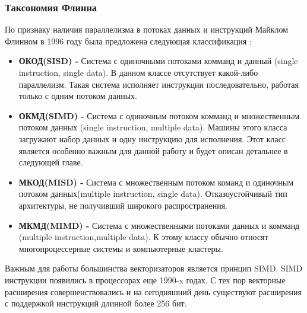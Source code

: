 \subsubsection{Таксономия Флинна}
По признаку наличия параллелизма в потоках данных и инструкций Майклом Флинном в 1996 году была предложена следующая классификация \cite{skillicorn1988taxonomy}:
\begin{itemize}
  \item \textbf{ОКОД(SISD) - } Система с одиночными потоками комманд и данный (single instruction, single data). В данном классе отсутствует какой-либо параллелизм. Такая система исполняет инструкции последовательно, работая только с одним потоком данных.
  
  \item \textbf{ОКМД(SIMD) - } Система с одиночным потоком комманд и множественным потоком данных (single instruction, multiple data). Машины этого класса загружают набор данных и одну инструкцию для исполнения. Этот класс является особенно важным для данной работу и будет описан детальнее в следующей главе.
  
  \item  \textbf{МКОД(MISD) -} Система с множественным потоком команд и одиночным потоком данных(multiple instruction, single data). Отказоустойчивый тип архитектуры, не получивший широкого распространения.
  
  \item  \textbf{МКМД(MIMD) -} Система с множественными потоками данных и комманд (multiple instruction,multiple data). К этому классу обычно относят многопроцессерные системы и компьютерные кластеры. 
\end{itemize}

Важным для работы большинства векторизаторов является принцип SIMD. SIMD инструкции появились в процессорах еще 1990-x годах. С тех пор векторные расширения совершенствовались и на сегодняшний день существуют расширения с поддержкой инструкций длинной более 256 бит.

\newpage
